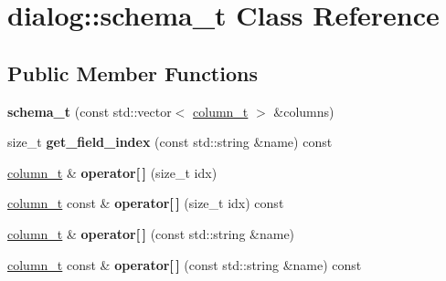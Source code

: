\hypertarget{classdialog_1_1schema__t}{}\section{dialog\+:\+:schema\+\_\+t Class Reference}
\label{classdialog_1_1schema__t}
\subsection*{Public Member Functions}
\begin{DoxyCompactItemize}
\item 
\mbox{\label{classdialog_1_1schema__t_adf83b572ffcaf1df16df3635217ec68d}} 
{\bfseries schema\+\_\+t} (const std\+::vector$<$ \hyperlink{classdialog_1_1column__t}{column\+\_\+t} $>$ \&columns)
\item 
\mbox{\label{classdialog_1_1schema__t_a068886657a1bf619541dd564364f6faf}} 
size\+\_\+t {\bfseries get\+\_\+field\+\_\+index} (const std\+::string \&name) const
\item 
\mbox{\label{classdialog_1_1schema__t_a803e4e0f3c024bc23dd44fb229ad48a0}} 
\hyperlink{classdialog_1_1column__t}{column\+\_\+t} \& {\bfseries operator\mbox{[}$\,$\mbox{]}} (size\+\_\+t idx)
\item 
\mbox{\label{classdialog_1_1schema__t_acb75c2928a54e9749c71437db8c857c6}} 
\hyperlink{classdialog_1_1column__t}{column\+\_\+t} const  \& {\bfseries operator\mbox{[}$\,$\mbox{]}} (size\+\_\+t idx) const
\item 
\mbox{\label{classdialog_1_1schema__t_a5fbe7cb1658a3184ea55895a40d24c85}} 
\hyperlink{classdialog_1_1column__t}{column\+\_\+t} \& {\bfseries operator\mbox{[}$\,$\mbox{]}} (const std\+::string \&name)
\item 
\mbox{\label{classdialog_1_1schema__t_a9566030c4c3a5f370cbf65a73825a5a9}} 
\hyperlink{classdialog_1_1column__t}{column\+\_\+t} const  \& {\bfseries operator\mbox{[}$\,$\mbox{]}} (const std\+::string \&name) const
\item 
\mbox{\label{classdialog_1_1schema__t_ace0c4340eb09e65d6cd41b273da9671a}} 

\end{DoxyCompactItemize}

